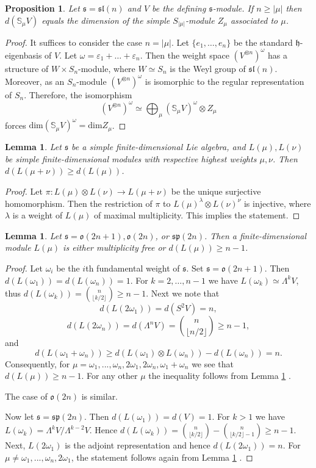 \documentclass[12pt]{amsart}
\makeatletter
\def\@putname#1#2#3#4{\def\@@ref{#3}\let\old@bf\bf
        \def\bf##1{\old@bf\if?\noexpand##1?{#4}\else##1\fi}%
	#1{#2}%
        \let\bf\old@bf}
\def\@putname#1#2#3#4{\def\@@ref{#3}\let\old@bf\bf	%
	\let\old@reset@font\reset@font			%
        \def\bf##1{\old@bf\if?\noexpand##1?{#4}\else##1\fi}%
	\def\reset@font##1##2{\old@reset@font##1\if?\noexpand##2?{#4}\else##2\fi}#1{#2}%
        \let\bf\old@bf\let\reset@font\old@reset@font}
\let\my@ref=\ref
\def\ref#1{\@putname\my@ref{#1}{#1}{\tiny\rm\@@ref}}
\theoremstyle{plain} %
\numberwithin{equation}{section}
\theoremstyle{definition}
\theoremstyle{remark}
\theoremstyle{plain} %
\newtheorem{lemma}[definition]{Lemma}
\newtheorem{proposition}[definition]{Proposition}
\renewcommand{\sp}{\mathfrak{sp}}
\newcommand{\so}{\mathfrak{o}}
\renewcommand{\dim}{\mathrm{dim}}
\newcommand{\gs}{\mathfrak{s}}
\newcommand{\gh}{\mathfrak{h}}
\def\gh{\mathfrak{h}}
\def\gs{\mathfrak{s}}
\makeatother
\begin{document}
\begin{proposition}\label{finrankintegrablesl} Let $\gs=\mathfrak{sl}(n)$ and $V$ be the defining $\gs$-module. If $n\geq |\mu|$ then $d(\mathbb S_\mu V)$ equals the dimension of the simple $S_{|\mu|}$-module $Z_{\mu}$ associated to $\mu$. 
\end{proposition}
\begin{proof} It suffices to consider the case $n=|\mu|$. Let $\{e_1,\dots,e_{n}\}$ be the standard $\gh$-eigenbasis of $V$.
  Let $\omega=\varepsilon_1+\dots+\varepsilon_n$. Then the weight space $(V^{\otimes n})^\omega$ has a structure of $W\times S_n$-module,
  where $W\simeq S_n$ is the Weyl group of $\mathfrak{sl}(n)$. Moreover, as an $S_n$-module $(V^{\otimes n})^\omega$ is isomorphic to the regular representation of $S_n$. Therefore, the isomorphism
  $$(V^{\otimes n})^\omega\simeq \bigoplus_\mu{} (\mathbb S_\mu V)^\omega\otimes Z_\mu$$
 forces $\dim (\mathbb S_\mu V)^\omega = \dim Z_\mu$. 
\end{proof}
\begin{lemma}\label{estimate} Let $\gs$ be a simple finite-dimensional Lie algebra, and $L(\mu), L(\nu)$ be simple finite-dimensional modules with respective  highest weights $\mu,\nu$. Then $d(L(\mu+\nu))\geq d(L(\mu))$.
\end{lemma}
\begin{proof} 
	Let $\pi:L(\mu)\otimes L(\nu)\to L(\mu+\nu)$ be the unique surjective homomorphism. Then the restriction of $\pi$ to $L(\mu)^\lambda\otimes L(\nu)^\nu$ is injective,  where $\lambda$ is a weight of $L(\mu)$ of maximal multiplicity. This implies the statement.
\end{proof}
\begin{lemma}\label{degreefinite} Let $\gs=\so(2n+1),\so(2n)$, or $\sp(2n)$. Then a finite-dimensional module $L(\mu)$  is either multiplicity free or $d(L(\mu))\geq n-1$. 
\end{lemma}
\begin{proof} Let  $\omega_i$ be the $i$th fundamental weight of $\gs$. Set $\gs=\so(2n+1)$. Then $d(L(\omega_1))=d(L(\omega_n))=1$. For $k=2,\dots,n-1$ we have $L(\omega_k)\simeq\Lambda^k V$, thus $d(L(\omega_k))=\binom{n}{\lfloor{k/2}\rfloor}\geq n-1$.
  Next we note that
  $$d(L(2\omega_1))=d(S^2 V)=n,$$
  $$d(L(2\omega_n))=d(\Lambda^n V )=\binom{n}{\lfloor{n/2}\rfloor}\geq n-1,$$
  and
  $$d(L(\omega_1+\omega_n))\geq d(L(\omega_1)\otimes L(\omega_n))-d(L(\omega_n))=n.$$
  Consequently,  for $\mu = \omega_1,...,\omega_n, 2\omega_1, 2\omega_n, \omega_1 + \omega_n$ we see that $d(L(\mu))\geq n-1$. For any other $\mu$ the inequality follows from Lemma \ref{estimate}.

  The case of $\so(2n)$ is similar.

  Now let $\gs=\sp(2n)$. Then $d(L(\omega_1))=d(V)=1$. For $k>1$ we have $L(\omega_k)=\Lambda^k V/\Lambda^{k-2} V$. Hence $d(L(\omega_k))=\binom{n}{\lfloor{k/2}\rfloor}-\binom{n}{\lfloor{k/2}\rfloor-1}\geq n-1$.
  Next, $L(2\omega_1)$ is the adjoint representation and hence $d(L(2\omega_1))=n$. For $\mu \neq \omega_1,...,\omega_n, 2\omega_1$,  the statement follows again from Lemma \ref{estimate}.
  \end{proof}
      
\end{document}
